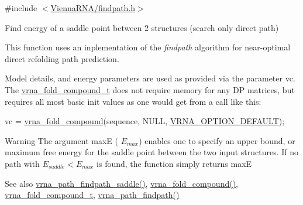 {\ttfamily \#include $<$\mbox{\hyperlink{findpath_8h}{Vienna\+R\+N\+A/findpath.\+h}}$>$}



Find energy of a saddle point between 2 structures (search only direct path) 

This function uses an inplementation of the {\itshape findpath} algorithm \cite{flamm:2001} for near-\/optimal direct refolding path prediction.

Model details, and energy parameters are used as provided via the parameter \textquotesingle{}vc\textquotesingle{}. The \mbox{\hyperlink{group__fold__compound_ga1b0cef17fd40466cef5968eaeeff6166}{vrna\+\_\+fold\+\_\+compound\+\_\+t}} does not require memory for any DP matrices, but requires all most basic init values as one would get from a call like this\+: 
\begin{DoxyCode}
vc = \mbox{\hyperlink{group__fold__compound_ga6601d994ba32b11511b36f68b08403be}{vrna\_fold\_compound}}(sequence, NULL, \mbox{\hyperlink{group__fold__compound_gacea5b7ee6181c485f36e2afa0e9089e4}{VRNA\_OPTION\_DEFAULT}});
\end{DoxyCode}


\begin{DoxyWarning}{Warning}
The argument {\ttfamily maxE} ( $E_{max}$) enables one to specify an upper bound, or maximum free energy for the saddle point between the two input structures. If no path with $E_{saddle} < E_{max}$ is found, the function simply returns {\ttfamily maxE} 
\end{DoxyWarning}
\begin{DoxySeeAlso}{See also}
\mbox{\hyperlink{group__direct__paths_gad611574a76593e26021f177e7854b6b4}{vrna\+\_\+path\+\_\+findpath\+\_\+saddle()}}, \mbox{\hyperlink{group__fold__compound_ga6601d994ba32b11511b36f68b08403be}{vrna\+\_\+fold\+\_\+compound()}}, \mbox{\hyperlink{group__fold__compound_ga1b0cef17fd40466cef5968eaeeff6166}{vrna\+\_\+fold\+\_\+compound\+\_\+t}}, \mbox{\hyperlink{group__direct__paths_ga4b2283c4142cafd99678495585fcc842}{vrna\+\_\+path\+\_\+findpath()}}
\end{DoxySeeAlso}

